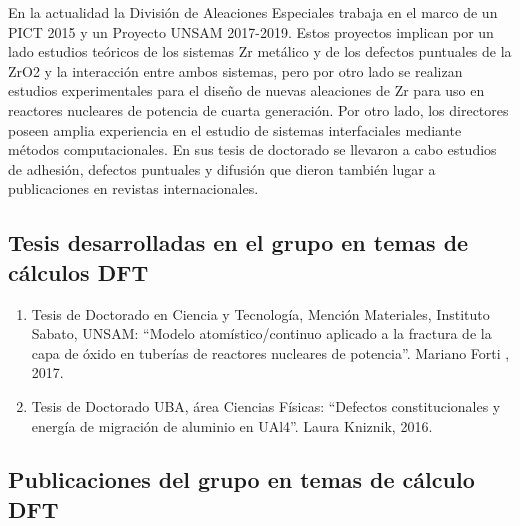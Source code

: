 En la actualidad la División de Aleaciones Especiales trabaja en el marco de un 
PICT 2015 y un Proyecto UNSAM 2017-2019. Estos proyectos implican por un lado 
estudios teóricos de los sistemas Zr metálico y de los defectos puntuales de la 
ZrO2 y la interacción entre ambos sistemas, pero por otro lado se realizan 
estudios experimentales para el diseño de nuevas aleaciones de Zr para uso en 
reactores nucleares de potencia de cuarta generación. 
Por otro lado, los directores poseen amplia experiencia en el estudio de 
sistemas interfaciales mediante métodos computacionales. En sus tesis de 
doctorado se llevaron a cabo estudios de adhesión, defectos puntuales y 
difusión que dieron también lugar a publicaciones en revistas internacionales. 

\subsection{ Tesis desarrolladas en el grupo en temas de cálculos DFT}

\begin{enumerate}


\item Tesis de Doctorado en Ciencia y Tecnología, Mención Materiales, 
Instituto Sabato, UNSAM: “Modelo atomístico/continuo aplicado a la fractura de 
la capa de óxido en tuberías de reactores nucleares de potencia”. Mariano Forti 
, 2017.

\item Tesis de Doctorado UBA, área Ciencias Físicas: “Defectos 
constitucionales y energía de migración de aluminio en UAl4”. Laura Kniznik, 
2016. 

\end{enumerate}

\subsection{ Publicaciones del grupo en temas de cálculo DFT}

